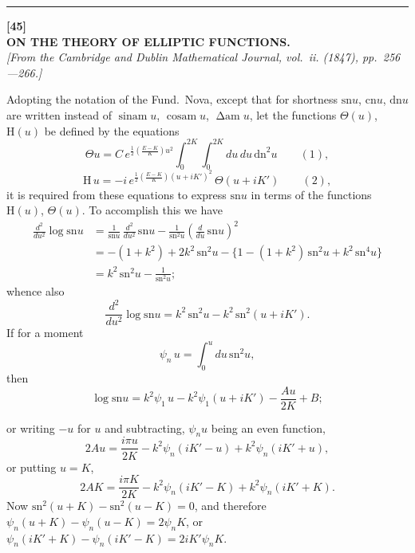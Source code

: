 \documentclass[11pt,a4paper]{article}
\newcommand{\sno}{\mathrm{sn}}
\newcommand{\cno}{\mathrm{cn}}
\newcommand{\dno}{\mathrm{dn}}
\begin{document}
\vspace{20pt}
\begin{center}
\rule{0.5\textwidth}{0.4pt}
\end{center}


\newpage
\begin{center}
\textbf{[45]}\\[4pt]
\textbf{\large ON THE THEORY OF ELLIPTIC FUNCTIONS.}\\[4pt]
\textit{[From the Cambridge and Dublin Mathematical Journal, vol.~ii. (1847), pp.~256---266.]}
\end{center}

\vspace{6pt}

Adopting the notation of the Fund.\ Nova, except that for shortness $\sno u$, $\cno u$, $\dno u$ are written instead of $\operatorname{sinam} u$, $\operatorname{cosam} u$, $\operatorname{\Delta am} u$, let the functions $\Theta(u)$, $\mathrm{H}(u)$ be defined by the equations
\[
\Theta u = C \, e^{\frac{1}{2}\left(\frac{E-K}{K}\right)u^2} \int_0^{2K} \!\!\int_0^{2K} du\,du \, \dno^2 u \qquad(1),
\]
\[
\mathrm{H}\,u = -i\,e^{\frac{1}{2}\left(\frac{E-K}{K}\right)(u+iK')^2} \, \Theta(u+iK') \qquad(2),
\]
it is required from these equations to express $\sno u$ in terms of the functions $\mathrm{H}(u)$, $\Theta(u)$. To accomplish this we have
\begin{align*}
\frac{d^2}{du^2} \log \sno u &= \frac{1}{\sno u}\,\frac{d^2}{du^2}\,\sno u - \frac{1}{\sno^2 u}\left(\frac{d}{du}\,\sno u\right)^2 \\
&= -(1+k^2) + 2k^2\,\sno^2 u - \{1 - (1+k^2)\,\sno^2 u + k^2\,\sno^4 u\} \\
&= k^2\,\sno^2 u - \frac{1}{\sno^2 u};
\end{align*}
whence also
\[
\frac{d^2}{du^2} \log \sno u = k^2\,\sno^2 u - k^2\,\sno^2(u+iK').
\]
If for a moment
\[
\psi_n\,u = \int_0^u du\,\sno^2 u,
\]
then
\[
\log \sno u = k^2\psi_1\,u - k^2\psi_1(u+iK') - \frac{Au}{2K} + B;
\]

\newpage
or writing $-u$ for $u$ and subtracting, $\psi_n u$ being an even function,
\[
2Au = \frac{i\pi u}{2K} - k^2\psi_n(iK'-u) + k^2\psi_n(iK'+u),
\]
or putting $u = K$,
\[
2AK = \frac{i\pi K}{2K} - k^2\psi_n(iK'-K) + k^2\psi_n(iK'+K).
\]
Now $\sno^2(u+K) - \sno^2(u-K) = 0$,
and therefore $\psi_n(u+K) - \psi_n(u-K) = 2\psi_n K$,
or $\psi_n(iK'+K) - \psi_n(iK'-K) = 2iK'\psi_n K$.
\end{document}
